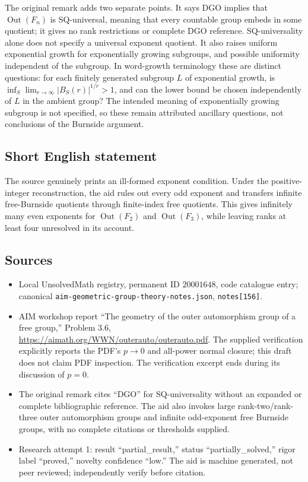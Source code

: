 \documentclass[11pt]{article}
\begin{document}
The original remark adds two separate points. It says DGO implies that \(\operatorname{Out}(F_n)\) is SQ-universal, meaning that every countable group embeds in some quotient; it gives no rank restrictions or complete DGO reference. SQ-universality alone does not specify a universal exponent quotient. It also raises uniform exponential growth for exponentially growing subgroups, and possible uniformity independent of the subgroup. In word-growth terminology these are distinct questions: for each finitely generated subgroup \(L\) of exponential growth, is \(\inf_S\lim_{r\to\infty}|B_S(r)|^{1/r}>1\), and can the lower bound be chosen independently of \(L\) in the ambient group? The intended meaning of exponentially growing subgroup is not specified, so these remain attributed ancillary questions, not conclusions of the Burnside argument.
\subsection{Short English statement}
The source genuinely prints an ill-formed exponent condition. Under the positive-integer reconstruction, the aid rules out every odd exponent and transfers infinite free-Burnside quotients through finite-index free quotients. This gives infinitely many even exponents for \(\operatorname{Out}(F_2)\) and \(\operatorname{Out}(F_3)\), while leaving ranks at least four unresolved in its account.
\subsection{Sources}
\begin{itemize}
\item Local UnsolvedMath registry, permanent ID \(20001648\), code catalogue entry; canonical \texttt{aim-geometric-group-theory-notes.json}, \texttt{notes[156]}.
\item AIM workshop report ``The geometry of the outer automorphism group of a free group,'' Problem 3.6, \url{https://aimath.org/WWN/outerauto/outerauto.pdf}. The supplied verification explicitly reports the PDF's \(p\to0\) and all-power normal closure; this draft does not claim PDF inspection. The verification excerpt ends during its discussion of \(p=0\).
\item The original remark cites ``DGO'' for SQ-universality without an expanded or complete bibliographic reference. The aid also invokes large rank-two/rank-three outer automorphism groups and infinite odd-exponent free Burnside groups, with no complete citations or thresholds supplied.
\item Research attempt 1: result ``partial\_result,'' status ``partially\_solved,'' rigor label ``proved,'' novelty confidence ``low.'' The aid is machine generated, not peer reviewed; independently verify before citation.
\end{itemize}
\end{document}
